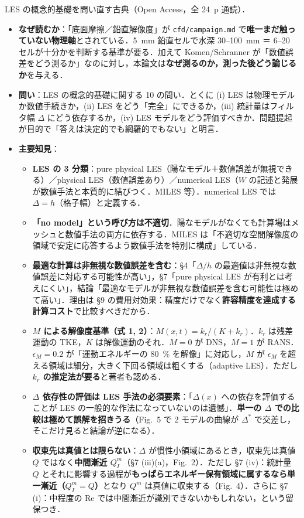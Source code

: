 \documentclass[11pt]{jsarticle}
\newcommand{\litref}[1]{{\large\bfseries\color{citecolor}#1}}
\begin{document}
\noindent\litref{Pope (2004)}\quad LES の概念的基礎を問い直す古典（Open Access，全 24~p 通読）．
\begin{itemize}
  \item \textbf{なぜ読むか}：「底面摩擦／鉛直解像度」が \texttt{cfd/campaign.md} で\textbf{唯一まだ触っていない物理軸}とされている．5~mm 鉛直セルで水深 30--100~mm ＝ 6--20 セルが十分かを判断する基準が要る．加えて Komen/Schranner が「数値誤差をどう測るか」なのに対し，本論文は\textbf{なぜ測るのか，測った後どう論じるか}を与える．
  \item \textbf{問い}：LES の概念的基礎に関する 10 の問い．とくに (i) LES は物理モデルか数値手続きか，(ii) LES をどう「完全」にできるか，(iii) 統計量はフィルタ幅 $\Delta$ にどう依存するか，(iv) LES モデルをどう評価すべきか．問題提起が目的で「答えは決定的でも網羅的でもない」と明言．
  \item \textbf{主要知見}：
  \begin{itemize}
    \item \textbf{LES の 3 分類}：pure physical LES（陽なモデル＋数値誤差が無視できる）／physical LES（数値誤差あり）／numerical LES（$W$ の記述と発展が数値手法と本質的に結びつく．MILES 等）．numerical LES では \textbf{$\Delta = h$}（格子幅）と定義する．
    \item \textbf{「no model」という呼び方は不適切}．陽なモデルがなくても計算場はメッシュと数値手法の両方に依存する．MILES は「不適切な空間解像度の領域で安定に応答するよう数値手法を特別に構成」している．
    \item \textbf{最適な計算は非無視な数値誤差を含む}：§4「$\Delta/h$ の最適値は非無視な数値誤差に対応する可能性が高い」，§7「pure physical LES が有利とは考えにくい」，結論「最適なモデルが非無視な数値誤差を含む可能性は極めて高い」．理由は §9 の費用対効果：精度だけでなく\textbf{許容精度を達成する計算コスト}で比較すべきだから．
    \item \textbf{$M$ による解像度基準（式 1, 2）}：$M(x,t) = k_r/(K + k_r)$．$k_r$ は残差運動の TKE，$K$ は解像運動のそれ．$M = 0$ が DNS，$M = 1$ が RANS．$\epsilon_M = 0.2$ が「運動エネルギーの 80~\% を解像」に対応し，$M$ が $\epsilon_M$ を超える領域は細分，大きく下回る領域は粗くする（adaptive LES）．ただし\textbf{$k_r$ の推定法が要る}と著者も認める．
    \item \textbf{$\Delta$ 依存性の評価は LES 手法の必須要素}：「$\Delta(x)$ への依存を評価することが LES の一般的な作法になっていないのは遺憾」．\textbf{単一の $\Delta$ での比較は極めて誤解を招きうる}（Fig.~5 で 2 モデルの曲線が $\Delta^*$ で交差し，そこだけ見ると結論が逆になる）．
    \item \textbf{収束先は真値とは限らない}：$\Delta$ が慣性小領域にあるとき，収束先は真値 $Q$ ではなく\textbf{中間漸近 $Q_I^m$}（§7 (iii)(a)，Fig.~2）．ただし §7 (iv)：統計量 $Q$ とそれに影響する過程が\textbf{もっぱらエネルギー保有領域に属するなら単一漸近（$Q_I^m = Q$）}となり $Q^m$ は真値に収束する（Fig.~4）．さらに §7 (i)：中程度の Re では中間漸近が識別できないかもしれない，という留保つき．

\end{itemize}
\end{itemize}
\end{document}
